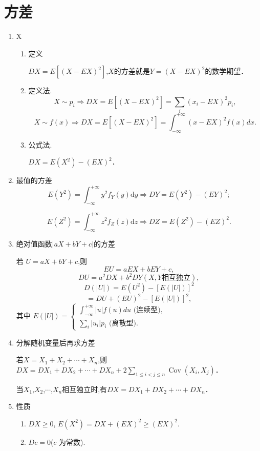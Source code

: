 \section{方差}
\begin{enumerate}
      \item X
            \begin{enumerate}
                  \item 定义

                        $DX = E[(X - EX)^2]$,$X$的方差就是$Y = (X - EX)^2$的数学期望．
                  \item 定义法.
                        $$X \sim p_i \Rightarrow DX = E[(X - EX)^2] = \sum_i (x_i - EX)^2 p_i,$$
                        $$X \sim f(x) \Rightarrow DX = E[(X - EX)^2] = \int_{-\infty}^{+\infty} (x - EX)^2 f(x) dx.$$
                  \item 公式法.

                        $DX = E(X^2) - (EX)^2$．
            \end{enumerate}
      \item 最值的方差
            $$E(Y^{2})=\int_{-\infty}^{+\infty}y^{2}f_{Y}(y)\mathrm{d}y\Rightarrow DY=E(Y^{2})-(EY)^{2};$$

            $$E(Z^{2})=\int_{-\infty}^{+\infty}z^{2}f_{Z}(z)\mathrm{d}z\Rightarrow DZ=E(Z^{2})-(EZ)^{2}.$$
      \item 绝对值函数$|aX+bY+c|$的方差

            若 $U=aX+bY+c$,则
            $$EU=aEX+bEY+c,$$
            $$
                  DU=a^2DX+b^2DY(X,Y \text{相互独立}),$$
            $$D(|U|)=E(U^2)-[E(|U|)]^2$$
            $$
                  =DU+(EU)^2-[E(|U|)]^2,$$
            其中 $E(|U|)=\begin{cases}\int_{-\infty}^{+\infty}|u|f(u)du \text{ (连续型)},\\\sum_i|u_i|p_i \text{ (离散型)}.\end{cases}$
      \item 分解随机变量后再求⽅差

            若$X=X_{1}+X_{2}+\cdots+X_{n}$,则$DX=DX_{1}+DX_{2}+\cdots+DX_{n}+2\sum_{1\leqslant i<j\leqslant n}\operatorname{Cov}(X_{i},X_{j})$．

            当$X_{1}$,$X_{2}$,$\cdots$,$X_{n}$相互独立时,有$DX=DX_{1}+DX_{2}+\cdots+DX_{n}$．
      \item 性质
            \begin{enumerate}
                  \item $DX \geqslant 0$, $E(X^2) = DX + (EX)^2 \geqslant (EX)^2$.
                  \item $Dc = 0$($c$ 为常数).


\end{enumerate}
\end{enumerate}
